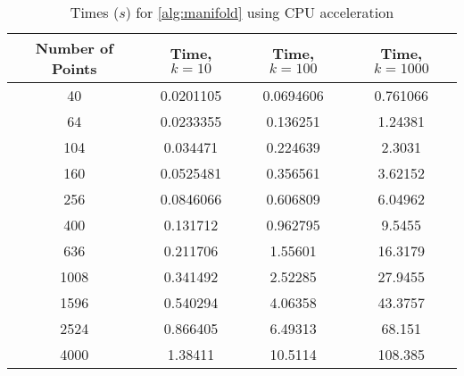 \begin{table}[ht!]
    \centering
    {\footnotesize
        \begin{tabular}{| c | c c c |}
            \hline
            Number of Points & Time, $k=10$ &  Time, $k=100$ &   Time, $k=1000$ \\
            \hline
            40  &  0.0201105   &   0.0694606    &    0.761066 \\
            64  &  0.0233355   &   0.136251     &    1.24381 \\
            104  &  0.034471    &   0.224639     &    2.3031 \\
            160  &  0.0525481   &   0.356561     &    3.62152 \\
            256  &  0.0846066   &   0.606809     &    6.04962 \\
            400  &  0.131712    &   0.962795     &    9.5455 \\
            636  &  0.211706    &   1.55601      &   16.3179 \\
            1008  &  0.341492    &   2.52285      &   27.9455 \\
            1596  &  0.540294    &   4.06358      &   43.3757 \\
            2524  &  0.866405    &   6.49313      &   68.151 \\
            4000  &  1.38411     &  10.5114       &  108.385 \\
            \hline
        \end{tabular}
    }
    \caption{Times ($s$) for \autoref{alg:manifold} using CPU acceleration}
    \label{tb:cpu}
\end{table}

